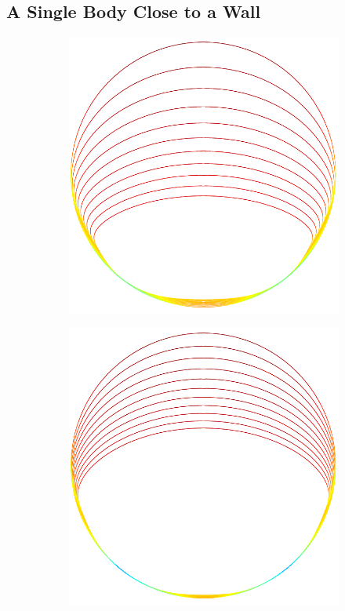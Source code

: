\documentclass{jfm}
\begin{document}
\subsection{A Single Body Close to a Wall}
\begin{figure}
\begin{center}
\begin{subfigure}[b]{0.27\textwidth}
\includegraphics[height = \textwidth]{./figs/1b_0d4r1h_shear}
\caption{}
\end{subfigure}
\begin{subfigure}[b]{0.27\textwidth}
\includegraphics[height = \textwidth]{./figs/1b_0d4r0d5h_shear}

\end{subfigure}
\end{center}
\end{figure}
\end{document}
